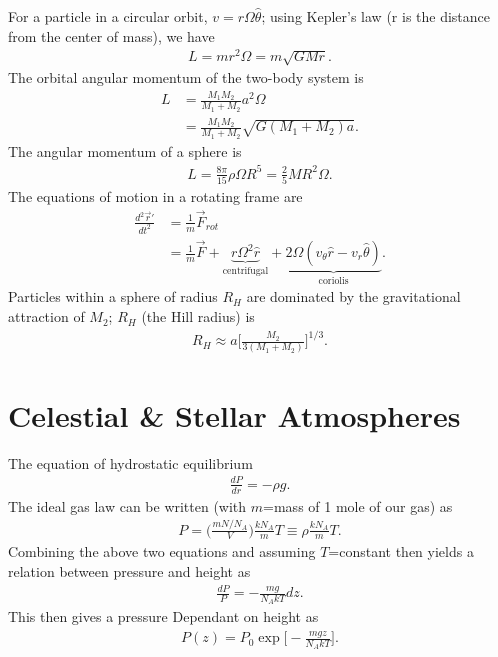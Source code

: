 \begin{multicols}{2}
For a particle in a circular orbit, $v = r\Omega \hat{\theta}$; using Kepler’s law (r is the distance from the center of mass), we have
\begin{align}
L=mr^2\Omega = m\sqrt{GMr}.
\end{align}
The orbital angular momentum of the two-body system is
\begin{align}
L&=\frac{M_1M_2}{M_1+M_2} a^2\Omega\\
&= \frac{M_1M_2}{M_1+M_2}\sqrt{G(M_1+M_2)a}.
\end{align}
The angular momentum of a sphere is
\begin{align}
L=\frac{8\pi}{15}\rho\Omega R^5=\frac{2}{5}MR^2\Omega.
\end{align}
The equations of motion in a rotating frame are
\begin{align}
\frac{d^2\vec{r}'}{dt^2}&=\frac{1}{m}\vec{F}_{rot} \\
&=\frac{1}{m}\vec{F}+\underbrace{r\Omega^2\hat{r}}_\text{centrifugal}+\underbrace{2\Omega(v_\theta\hat{r}-v_r\hat{\theta})}_\text{coriolis}.
\end{align}
Particles within a sphere of radius $R_H$ are dominated by the gravitational attraction of $M_2$; $R_H$ (the Hill radius) is
\begin{align}
R_H\approx a\bigg[\frac{M_2}{3(M_1+M_2)} \bigg]^{1/3}.
\end{align}





\section{Celestial \& Stellar Atmospheres}
The equation of hydrostatic equilibrium
\begin{align}
\frac{dP}{dr}=-\rho g.
\end{align}
The ideal gas law can be written (with $m$=mass of 1 mole of our gas) as 
\begin{align}
P=\bigg(\frac{mN/N_A}{V} \bigg)\frac{kN_A}{m}T\equiv \rho \frac{kN_A}{m}T.
\end{align}
Combining the above two equations and assuming $T$=constant then yields a relation between pressure and height as
\begin{align}
\frac{dP}{P}=-\frac{mg}{N_AkT}dz.
\end{align}
This then gives a pressure Dependant on height as
\begin{align}
P(z)=P_0\exp\bigg[-\frac{mgz}{N_AkT} \bigg].
\end{align}


\end{multicols}
